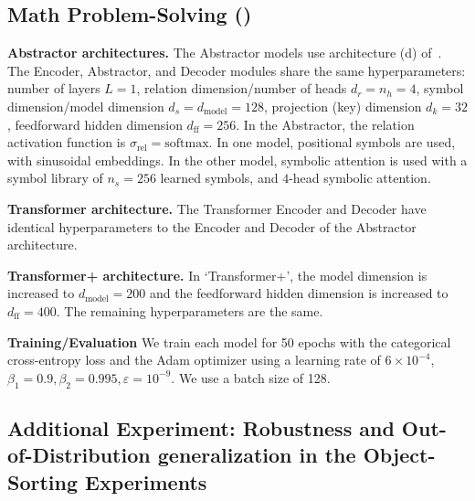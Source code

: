 \subsection{Math Problem-Solving ()}

\textbf{Abstractor architectures.} The Abstractor models use architecture (d) of~. The Encoder, Abstractor, and Decoder modules share the same hyperparameters: number of layers $L = 1$, relation dimension/number of heads $d_r = n_h = 4$, symbol dimension/model dimension $d_s = d_{\mathrm{model}} = 128$, projection (key) dimension $d_k = 32$, feedforward hidden dimension $d_{\mathrm{ff}} = 256$. In the Abstractor, the relation activation function is $\sigma_{\mathrm{rel}} = \mathrm{softmax}$. In one model, positional symbols are used, with sinusoidal embeddings. In the other model, symbolic attention is used with a symbol library of $n_s = 256$ learned symbols, and $4$-head symbolic attention.

\textbf{Transformer architecture.} The Transformer Encoder and Decoder have identical hyperparameters to the Encoder and Decoder of the Abstractor architecture.

\textbf{Transformer+ architecture.} In `Transformer+', the model dimension is increased to $d_\mathrm{model} = 200$ and the feedforward hidden dimension is increased to $d_{\mathrm{ff}} = 400$. The remaining hyperparameters are the same.

\textbf{Training/Evaluation} We train each model for 50 epochs with the categorical cross-entropy loss and the Adam optimizer using a learning rate of $6 \times 10^{-4}$, $\beta_1 = 0.9, \beta_2 = 0.995, \varepsilon = 10^{-9}$. We use a batch size of 128.

\subsection{Additional Experiment: Robustness and Out-of-Distribution generalization in the Object-Sorting Experiments}

